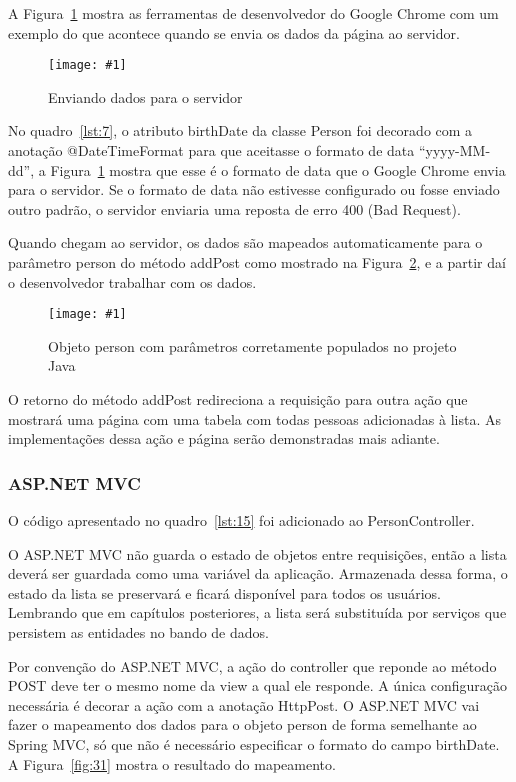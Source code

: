 \documentclass[a4paper,12pt]{article}
\newcommand{\figura}[3] {
	\begin{figure}[ht]
		\centering
		\texttt{[image: \#1]}
		\caption{#2}
		\label{#3}
	\end{figure}
	\FloatBarrier
}
\newcommand{\sharpcode}[3] {
	
	\FloatBarrier
}
\begin{document}
A Figura~\ref{fig:29} mostra as ferramentas de desenvolvedor do Google Chrome com um exemplo do que acontece quando se envia os dados da página ao servidor.

\figura{29.png}{Enviando dados para o servidor}{fig:29}

No quadro~\ref{lst:7}, o atributo birthDate da classe Person foi decorado com a anotação @DateTimeFormat para que aceitasse o formato de data “yyyy-MM-dd”, a Figura~\ref{fig:29} mostra que esse é o formato de data que o Google Chrome envia para o servidor. Se o formato de data não estivesse configurado ou fosse enviado outro padrão, o servidor enviaria uma reposta de erro 400 (Bad Request).

Quando chegam ao servidor, os dados são mapeados automaticamente para o parâmetro person do método addPost como mostrado na Figura~\ref{fig:30}, e a partir daí o desenvolvedor trabalhar com os dados.

\figura{30.png}{Objeto person com parâmetros corretamente populados no projeto Java}{fig:30}

O retorno do método addPost redireciona a requisição para outra ação que mostrará uma página com uma tabela com todas pessoas adicionadas à lista. As implementações dessa ação e página serão demonstradas mais adiante.

\subsubsection{ASP.NET MVC}

O código apresentado no quadro~\ref{lst:15} foi adicionado ao PersonController.

\sharpcode{code/15.txt}{PersonController do projeto ASP.NET com nova ação}{lst:15}

O ASP.NET MVC não guarda o estado de objetos entre requisições, então a lista deverá ser guardada como uma variável da aplicação. Armazenada dessa forma, o estado da lista se preservará e ficará disponível para todos os usuários. Lembrando que em capítulos posteriores, a lista será substituída por serviços que persistem as entidades no bando de dados.

Por convenção do ASP.NET MVC, a ação do controller que reponde ao método POST deve ter o mesmo nome da view a qual ele responde.  A única configuração necessária é decorar a ação com a anotação HttpPost. O ASP.NET MVC vai fazer o mapeamento dos dados para o objeto person de forma semelhante ao Spring MVC, só que não é necessário especificar o formato do campo birthDate. A Figura~\ref{fig:31} mostra o resultado do mapeamento.
\end{document}
